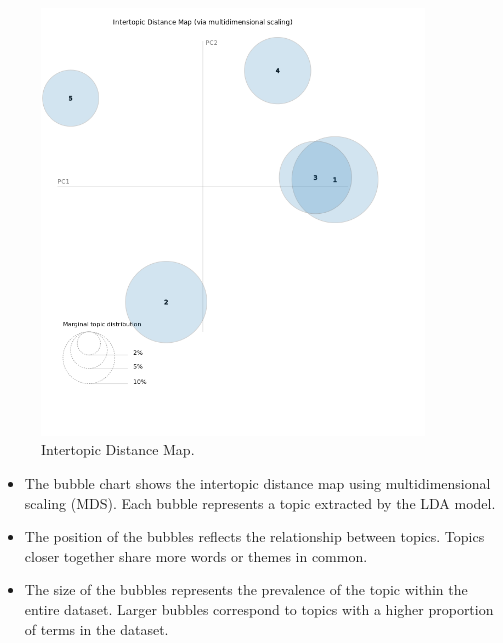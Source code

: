 \begin{center}
\begin{figure}[H]
  \centering
  \includegraphics[width=4in]{img/topics/png/topics.png}
  \caption{Intertopic Distance Map.}
  \label{Figure:intertopicdistancemap}
\end{figure}
\end{center}

\begin{itemize}
  \item The bubble chart shows the intertopic distance map using multidimensional
scaling (MDS). Each bubble represents a topic extracted by the LDA model.
  \item The position of the bubbles reflects the relationship between topics.
    Topics closer together share more words or themes in common.
  \item The size of the bubbles represents the prevalence of the topic within
    the entire dataset. Larger bubbles correspond to topics with a higher
    proportion of terms in the dataset.
\end{itemize}



